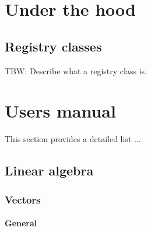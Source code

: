 \documentclass{article}[12pt,a4]
\begin{document}
\clearpage
\section{Under the hood}

\subsection{Registry classes}
\label{sec:registry}

TBW: Describe what a registry class is.


%
\clearpage
\section{Users manual}

This section provides a detailed list ...

\subsection{Linear algebra}

\subsubsection{Vectors}

\paragraph{General}
\end{document}
